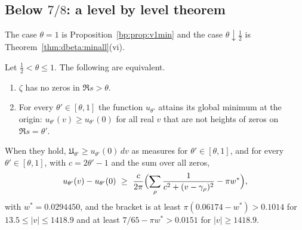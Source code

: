 \subsection{Below $7/8$: a level by level theorem}\label{cx:sec:lbl}

The case $\theta=1$ is Proposition~\ref{bp:prop:v1min} and the case $\theta\downarrow\tfrac12$ is Theorem~\ref{thm:dbeta:minall}(vi).

\begin{theorem}\label{cx:thm:lbl}
Let $\tfrac12<\theta\le1$. The following are equivalent.
\begin{enumerate}
\item[(i)] $\zeta$ has no zeros in $\Re s>\theta$.
\item[(ii)] For every $\theta'\in[\theta,1]$ the function $u_{\theta'}$ attains its global minimum at the origin: $u_{\theta'}(v)\ge u_{\theta'}(0)$ for all real $v$ that are not heights of zeros on $\Re s=\theta'$.
\end{enumerate}
When they hold, $\mathfrak U_{\theta'}\ge u_{\theta'}(0)\,dv$ as measures for $\theta'\in[\theta,1]$, and for every $\theta'\in[\theta,1]$, with $c=2\theta'-1$ and the sum over all zeros,
\begin{equation}\label{cx:eq:excess}
u_{\theta'}(v)-u_{\theta'}(0)\ \ge\ \frac{c}{2\pi}\Bigl(\sum_\rho\frac1{c^2+(v-\gamma_\rho)^2}-\pi w^*\Bigr),
\end{equation}
with $w^*=0.0294450$, and the bracket is at least $\pi(0.06174-w^*)>0.1014$ for $13.5\le|v|\le1418.9$ and at least $7/65-\pi w^*>0.0151$ for $|v|\ge1418.9$.
\end{theorem}


